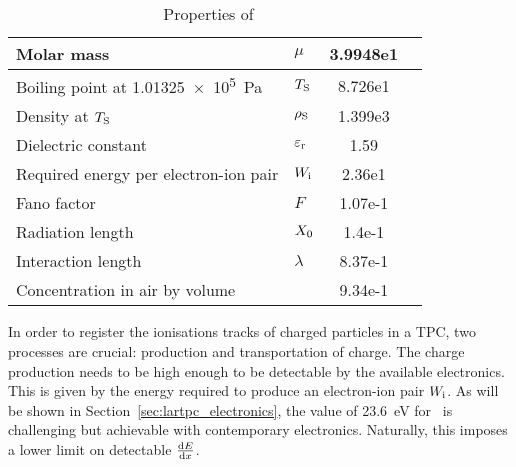 \begin{table}[htb]
	\centering
	\caption{Properties of \lar~\cite{NobleGasDetectors}}
	\label{tab:lartpc_larprop}
	\begin{tabular}{|ll|Ss|}
		\hline
		{Molar mass} &									$\mu$ &					3.9948e1 &	\gram\per\mol \\
		\hline
		{Boiling point at} \SI{1.01325e5}{\pascal} &	$T_{\mathrm{S}}$ &			8.726e1 &	\kelvin \\
		\hline
		{Density at} $T_{\mathrm{S}}$ &						$\rho_{\mathrm{S}}$ &		1.399e3 &	\kilo\gram\per\cubic\metre \\
		\hline
		{Dielectric constant} &							$\varepsilon_{\mathrm{r}}$ &	1.59 &		\\
		\hline
		{Required energy per electron-ion pair} &		$W_{\mathrm{i}}$ &			2.36e1 &	\electronvolt \\
		\hline
		{Fano factor} &									$F$ &					1.07e-1 &	\\
		\hline
		{Radiation length} &							$X_{\mathrm{0}}$ &			1.4e-1 &		\metre \\
		\hline
		{Interaction length} &							$\lambda$ &				8.37e-1 &	\metre \\
		\hline
		{Concentration in air by volume} &				&						9.34e-1 &	\percent \\
		\hline
	\end{tabular}
\end{table}

In order to register the ionisations tracks of charged particles in a TPC, two processes are crucial: production and transportation of charge.
The charge production needs to be high enough to be detectable by the available electronics.
This is given by the energy required to produce an electron-ion pair $W_{\mathrm{i}}$.
As will be shown in Section~\ref{sec:lartpc_electronics}, the value of \SI{23.6}{\electronvolt} for \lar\ is challenging but achievable with contemporary electronics.
Naturally, this imposes a lower limit on detectable $\frac{\mathrm{d}E}{\mathrm{d}x}$.

